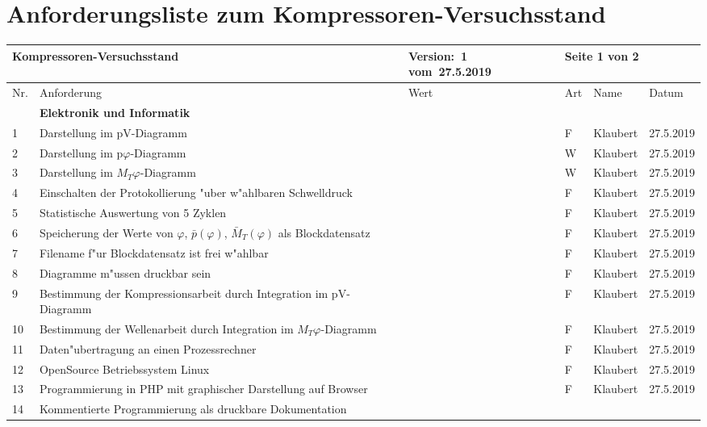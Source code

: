﻿\section{Anforderungsliste zum Kompressoren-Versuchsstand}
%
\begin{center}
\begin{tabular}{|l|p{5cm}|p{3cm}|l|l|l|}
\hline
\multicolumn{2}{|l|}{\textbf{Kompressoren-Versuchsstand}}
&  Version:~1   vom~27.5.2019
& \multicolumn{3}{|l|}{Seite 1 von 2} \\
\hline
Nr. & Anforderung & Wert & Art & Name & Datum\\
\hline
    & \textbf{Elektronik und Informatik} & & & & \\
 1 & Darstellung im pV-Diagramm  & & F
    & Klaubert & 27.5.2019\\
 2 & Darstellung im p$\varphi$-Diagramm  & & W
    & Klaubert & 27.5.2019\\
 3 & Darstellung im $M_T \varphi$-Diagramm  & & W
    & Klaubert & 27.5.2019\\
 4 & Einschalten der Protokollierung "uber w"ahlbaren Schwelldruck  & & F
    & Klaubert & 27.5.2019\\  
 5 & Statistische Auswertung von 5 Zyklen
    & & F & Klaubert & 27.5.2019 \\
 6 & Speicherung der Werte von $\varphi$, $\bar p(\varphi)$,
 $\bar M_T(\varphi)$ als Blockdatensatz
    & & F & Klaubert & 27.5.2019 \\
 7 & Filename f"ur Blockdatensatz ist frei w"ahlbar
    & & F & Klaubert & 27.5.2019 \\
 8 & Diagramme m"ussen druckbar sein
    & & F & Klaubert & 27.5.2019 \\
 9 & Bestimmung der Kompressionsarbeit durch Integration im pV-Diagramm
       & & F & Klaubert & 27.5.2019 \\
 10 & Bestimmung der Wellenarbeit durch Integration im $M_T \varphi$-Diagramm
       & & F & Klaubert & 27.5.2019 \\
 11 & Daten"ubertragung an einen Prozessrechner
    & & F & Klaubert & 27.5.2019 \\%
 12 & OpenSource Betriebssystem Linux
    & & F & Klaubert & 27.5.2019 \\
 13 & Programmierung in PHP mit graphischer Darstellung auf
    Browser & & F & Klaubert & 27.5.2019 \\
 14 & Kommentierte Programmierung als druckbare Dokumentation

\end{tabular}
\end{center}
